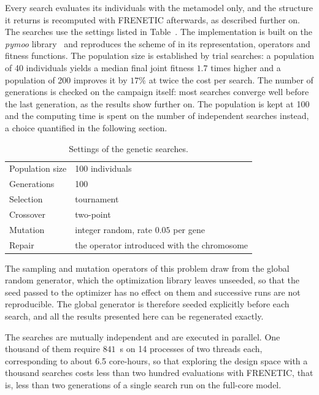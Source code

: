 Every search evaluates its individuals with the metamodel only, and the
structure it returns is recomputed with FRENETIC afterwards, as described
further on. The searches use the settings listed in
Table~. The implementation is built on the
\textit{pymoo} library~\cite{pymoo} and reproduces the scheme of
\citet{prevMulti} in its representation, operators and fitness functions. The
population size is established by trial searches: a population of 40
individuals yields a median final joint fitness $1.7$ times higher and a
population of 200 improves it by $17\%$ at twice the cost per search. The number
of generations is checked on the campaign itself: most searches converge well
before the last generation, as the results show further on. The population is
kept at 100 and the computing time is spent on the number of independent
searches instead, a choice quantified in the following section.

\begin{table}[htbp]
\centering
\caption[Settings of the genetic searches]{Settings of the genetic searches.}
\label{eg:tab:gasettings}
\begin{tabular}{ll}
\toprule
Population size & 100 individuals \\
Generations & 100 \\
Selection & tournament \\
Crossover & two-point \\
Mutation & integer random, rate $0.05$ per gene \\
Repair & the operator introduced with the chromosome \\
\bottomrule
\end{tabular}
\end{table}

The sampling and mutation operators of this problem draw from the global random
generator, which the optimization library leaves unseeded, so that the seed
passed to the optimizer has no effect on them and successive runs are not
reproducible. The global generator is therefore seeded explicitly before each
search, and all the results presented here can be regenerated exactly.

The searches are mutually independent and are executed in parallel. One thousand
of them require $841$~s on 14 processes of two threads each, corresponding to
about 6.5 core-hours, so that exploring the design space with a thousand
searches costs less than two hundred evaluations with FRENETIC, that is, less
than two generations of a single search run on the full-core model.

